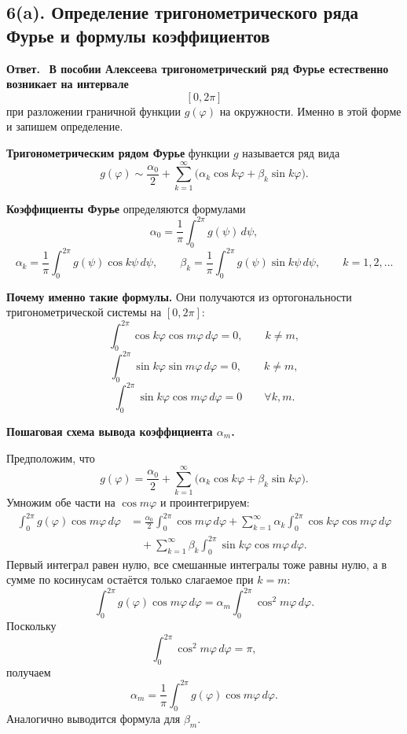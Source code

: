 \documentclass[a4paper,12pt]{article}
\newcommand{\Answer}{\textbf{Ответ.}\ }
\begin{document}
\subsection*{6(a). Определение тригонометрического ряда Фурье и формулы коэффициентов}

\Answer
\textbf{В пособии Алексеевa тригонометрический ряд Фурье естественно возникает на интервале}
\[
[0,2\pi]
\]
при разложении граничной функции $g(\varphi)$ на окружности. Именно в этой форме и запишем определение.

\textbf{Тригонометрическим рядом Фурье} функции $g$ называется ряд вида
\[
g(\varphi)\sim \frac{\alpha_0}{2}
+\sum_{k=1}^{\infty}\bigl(\alpha_k\cos k\varphi+\beta_k\sin k\varphi\bigr).
\]

\textbf{Коэффициенты Фурье} определяются формулами
\[
\alpha_0=\frac{1}{\pi}\int_0^{2\pi}g(\psi)\,d\psi,
\]
\[
\alpha_k=\frac{1}{\pi}\int_0^{2\pi}g(\psi)\cos k\psi\,d\psi,
\qquad
\beta_k=\frac{1}{\pi}\int_0^{2\pi}g(\psi)\sin k\psi\,d\psi,
\qquad
k=1,2,\dots
\]

\textbf{Почему именно такие формулы.}
Они получаются из ортогональности тригонометрической системы на $[0,2\pi]$:
\[
\int_0^{2\pi}\cos k\varphi \cos m\varphi\,d\varphi=0,
\qquad k\ne m,
\]
\[
\int_0^{2\pi}\sin k\varphi \sin m\varphi\,d\varphi=0,
\qquad k\ne m,
\]
\[
\int_0^{2\pi}\sin k\varphi \cos m\varphi\,d\varphi=0
\qquad \forall k,m.
\]

\textbf{Пошаговая схема вывода коэффициента \texorpdfstring{$\alpha_m$}{alpha m}.}

Предположим, что
\[
g(\varphi)=\frac{\alpha_0}{2}
+\sum_{k=1}^{\infty}\bigl(\alpha_k\cos k\varphi+\beta_k\sin k\varphi\bigr).
\]
Умножим обе части на $\cos m\varphi$ и проинтегрируем:
\[
\begin{aligned}
\int_0^{2\pi}g(\varphi)\cos m\varphi\,d\varphi
&=
\frac{\alpha_0}{2}\int_0^{2\pi}\cos m\varphi\,d\varphi
+\sum_{k=1}^{\infty}\alpha_k\int_0^{2\pi}\cos k\varphi\cos m\varphi\,d\varphi \\
&\quad
+\sum_{k=1}^{\infty}\beta_k\int_0^{2\pi}\sin k\varphi\cos m\varphi\,d\varphi.
\end{aligned}
\]
Первый интеграл равен нулю, все смешанные интегралы тоже равны нулю, а в сумме по косинусам остаётся только слагаемое при $k=m$:
\[
\int_0^{2\pi}g(\varphi)\cos m\varphi\,d\varphi
=
\alpha_m\int_0^{2\pi}\cos^2 m\varphi\,d\varphi.
\]
Поскольку
\[
\int_0^{2\pi}\cos^2 m\varphi\,d\varphi=\pi,
\]
получаем
\[
\alpha_m=\frac{1}{\pi}\int_0^{2\pi}g(\varphi)\cos m\varphi\,d\varphi.
\]
Аналогично выводится формула для $\beta_m$.
\end{document}

